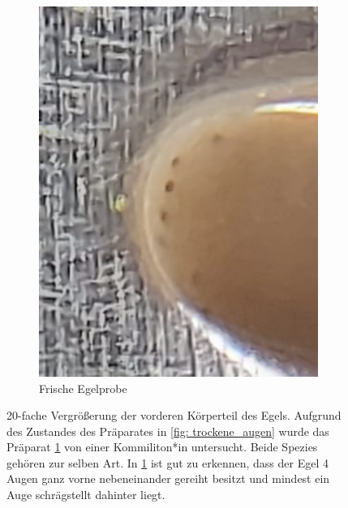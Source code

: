 \documentclass[oneside,10pt,a4paper]{report}
\begin{document}
\begin{figure}[H]
\begin{subfigure}[b]{0.37\textwidth}
						\includegraphics[width=\textwidth]{Dichotom_augen}
						\caption{Frische Egelprobe}
						\label{fig:feuchte_augen}
					\end{subfigure}
					\caption{20-fache Vergrößerung der vorderen Körperteil des Egels. Aufgrund des Zustandes des Präparates in \ref{fig: trockene_augen} wurde das Präparat \ref{fig:feuchte_augen} von einer Kommiliton*in  untersucht. Beide Spezies gehören zur selben Art. In \ref{fig:feuchte_augen} ist gut zu erkennen, dass der Egel 4 Augen ganz vorne nebeneinander gereiht besitzt und mindest ein Auge schrägstellt dahinter liegt.}
					\label{fig: Dicho_augent}
				\end{figure}
			
			
\end{document}

